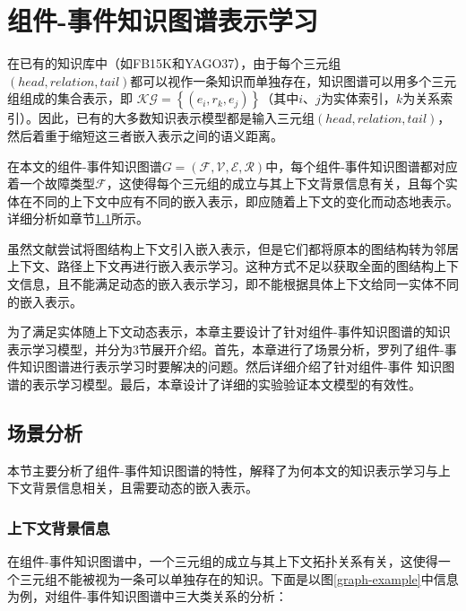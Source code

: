 \chapter{组件-事件知识图谱表示学习}\label{chapter-3}
在已有的知识库中（如FB15K\cite{bordes2013translatingE}和YAGO37\cite{guo2018knowledge}），由于每个三元组$\left(head, relation, tail\right)$都可以视作一条知识而单独存在，知识图谱可以用多个三元组组成的集合表示，即 $\mathcal{KG}=\left\{\left(e_{i}, r_{k}, e_{j}\right)\right\}$（其中$i$、$j$为实体索引，$k$为关系索引）。因此，已有的大多数知识表示模型都是输入三元组$\left(head, relation, tail\right)$，然后着重于缩短这三者嵌入表示之间的语义距离。

在本文的组件-事件知识图谱$G=(\mathcal{F}, \mathcal{V}, \mathcal{E}, \mathcal{R})$中，每个组件-事件知识图谱都对应着一个故障类型$\mathcal{F}$，这使得每个三元组的成立与其上下文背景信息有关，且每个实体在不同的上下文中应有不同的嵌入表示，即应随着上下文的变化而动态地表示。详细分析如章节\ref{backgroud-analysis}所示。

虽然文献\parencite{feng2016gake,shi2017knowledge}尝试将图结构上下文引入嵌入表示，但是它们都将原本的图结构转为邻居上下文、路径上下文再进行嵌入表示学习。这种方式不足以获取全面的图结构上下文信息，且不能满足动态的嵌入表示学习，即不能根据具体上下文给同一实体不同的嵌入表示。

为了满足实体随上下文动态表示，本章主要设计了针对组件-事件知识图谱的知识表示学习模型，并分为3节展开介绍。首先，本章进行了场景分析，罗列了组件-事件知识图谱进行表示学习时要解决的问题。然后详细介绍了针对组件-事件
知识图谱的表示学习模型。最后，本章设计了详细的实验验证本文模型的有效性。
\section{场景分析}\label{backgroud-analysis}
本节主要分析了组件-事件知识图谱的特性，解释了为何本文的知识表示学习与上下文背景信息相关，且需要动态的嵌入表示。

\subsection{上下文背景信息}\label{context-analysis}
在组件-事件知识图谱中，一个三元组的成立与其上下文拓扑关系有关，这使得一个三元组不能被视为一条可以单独存在的知识。下面是以图\ref{graph-example}中信息为例，对组件-事件知识图谱中三大类关系的分析：

